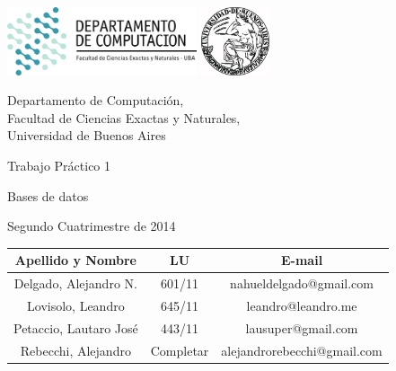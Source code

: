 \documentclass[a4paper, 10pt, twoside]{article}
\newcommand{\titulo}{Trabajo Práctico 1}
\newcommand{\materia}{Bases de datos}
\newcommand{\cuatrimestre}{Segundo Cuatrimestre de 2014}
\begin{document}


\thispagestyle{caratula}

\begin{center}

\includegraphics[height=2cm]{DC.png} 
\hfill
\includegraphics[height=2cm]{UBA.jpg} 

\vspace{2cm}

Departamento de Computación,\\
Facultad de Ciencias Exactas y Naturales,\\
Universidad de Buenos Aires

\vspace{4cm}

\begin{Huge}
\titulo
\end{Huge}

\vspace{0.5cm}

\begin{Large}
\materia
\end{Large}

\vspace{1cm}

\cuatrimestre

\vspace{4cm}

\begin{tabular}{|c|c|c|}
\hline
Apellido y Nombre & LU & E-mail\\
\hline
Delgado, Alejandro N.  & 601/11 & nahueldelgado@gmail.com\\
Lovisolo, Leandro      & 645/11 & leandro@leandro.me\\
Petaccio, Lautaro José & 443/11 & lausuper@gmail.com\\
Rebecchi, Alejandro & Completar & alejandrorebecchi@gmail.com\\
\hline
\end{tabular}

\end{center}
\end{document}

